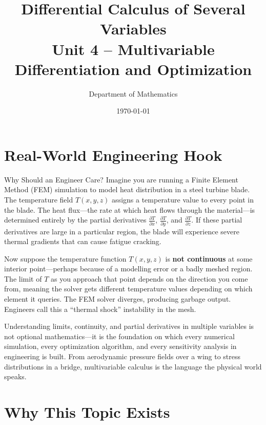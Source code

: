 \documentclass[12pt,a4paper]{article}
\title{\textbf{Differential Calculus of Several Variables} \\ \large Unit 4 -- Multivariable Differentiation and Optimization}
\author{Department of Mathematics}
\date{\today}
\begin{document}
\maketitle
\tableofcontents
\newpage

\section{Real-World Engineering Hook}

\begin{curiositybox}{Why Should an Engineer Care?}
Imagine you are running a Finite Element Method (FEM) simulation to model heat distribution in a steel turbine blade. The temperature field \(T(x, y, z)\) assigns a temperature value to every point in the blade. The heat flux---the rate at which heat flows through the material---is determined entirely by the partial derivatives \(\frac{\partial T}{\partial x}\), \(\frac{\partial T}{\partial y}\), and \(\frac{\partial T}{\partial z}\). If these partial derivatives are large in a particular region, the blade will experience severe thermal gradients that can cause fatigue cracking.

Now suppose the temperature function \(T(x,y,z)\) is \textbf{not continuous} at some interior point---perhaps because of a modelling error or a badly meshed region. The limit of \(T\) as you approach that point depends on the direction you come from, meaning the solver gets different temperature values depending on which element it queries. The FEM solver diverges, producing garbage output. Engineers call this a ``thermal shock'' instability in the mesh.

Understanding limits, continuity, and partial derivatives in multiple variables is not optional mathematics---it is the foundation on which every numerical simulation, every optimization algorithm, and every sensitivity analysis in engineering is built. From aerodynamic pressure fields over a wing to stress distributions in a bridge, multivariable calculus is the language the physical world speaks.
\end{curiositybox}

\section{Why This Topic Exists}
\end{document}
